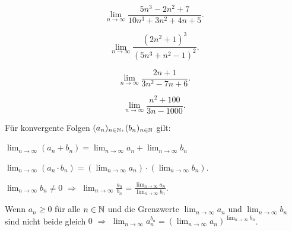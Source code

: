 

\begin{bsp} 
	{\ } 
	\begin{enuma} 
		\item \[
			\lim_{n \to \infty} \frac{5 n^3 - 2n^2 + 7}{10 n^3 + 3 n^2+ 4 n+5}.
		\]
		\item 
		\[
			\lim_{n \to \infty} \frac{(2 n^2 + 1 )^3 }{(5 n^3 + n^2 - 1)^2}.
		\]
		\item 
			\[
				\lim_{n \to \infty} \frac{2 n + 1}{3  n^2 - 7 n + 6}.
		\]
		\item 
		\[
			\lim_{n \to \infty} \frac{n^2 + 100}{3 n-1000} .
		\]
	\end{enuma} 
\end{bsp} 

\begin{thm} 
	Für konvergente Folgen $(a_n)_{n \in \mathbb{N}}, (b_n)_{n \in \mathbb{N}}$ gilt: 
	\begin{enuma}
		\item $\lim_{n \to \infty} (a_n + b_n) = \lim_{n \to \infty} a_n + \lim_{n \to \infty} b_n $
		\item $\lim_{n \to \infty} (a_n \cdot b_n) = ( \lim_{n \to \infty} a_n) \cdot (\lim_{n \to \infty} b_n)$. 
		\item $\lim_{n \to \infty} b_n \ne 0$ $\Longrightarrow$ $\lim_{n \to \infty} \frac{a_n}{b_n} = \frac{\lim_{n \to \infty} a_n}{\lim_{n \to \infty} b_n}$. 
		\item Wenn $a_n \ge 0$ für alle $n \in \mathbb{N}$ und die Grenzwerte $\lim_{n \to \infty} a_n$ und $\lim_{n \to \infty} b_n$ sind nicht beide gleich $0$ $\Longrightarrow$ $\lim_{n \to \infty} a_n^{b_n} = (\lim_{n \to \infty} a_n )^{\lim_{n \to \infty} b_n}$. 
	\end{enuma} 
\end{thm} 

